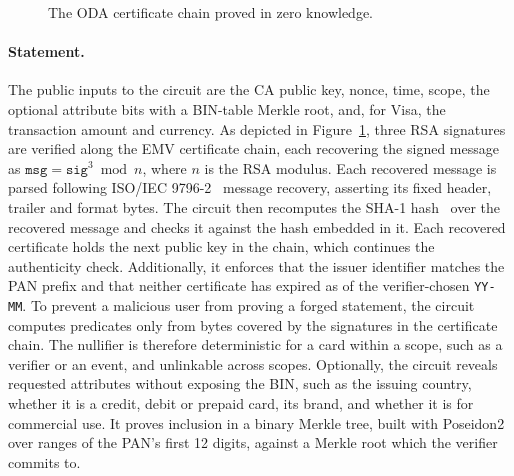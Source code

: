 \documentclass[10pt,a4paper]{article}
\begin{document}
\begin{figure}[t]
\centering
{}
\caption{The ODA certificate chain proved in zero knowledge.}
\label{fig:chain}
\end{figure}

\paragraph{Statement.}
The public inputs to the circuit are the CA public key, nonce, time, scope, the optional attribute bits with a BIN-table Merkle root, and, for Visa, the transaction amount and currency.
As depicted in Figure~\ref{fig:chain}, three RSA signatures are verified along the EMV certificate chain, each recovering the signed message as $\texttt{msg} = \texttt{sig} ^ 3 \bmod n$, where $n$ is the RSA modulus.
Each recovered message is parsed following ISO/IEC 9796-2~\cite{iso9796-2} message recovery, asserting its fixed header, trailer and format bytes.
The circuit then recomputes the SHA-1 hash~\cite{fips180-4} over the recovered message and checks it against the hash embedded in it.
Each recovered certificate holds the next public key in the chain, which continues the authenticity check.
Additionally, it enforces that the issuer identifier matches the PAN prefix and that neither certificate has expired as of the verifier-chosen \texttt{YY-MM}.
To prevent a malicious user from proving a forged statement, the circuit computes predicates only from bytes covered by the signatures in the certificate chain.
The nullifier is therefore deterministic for a card within a scope, such as a verifier or an event, and unlinkable across scopes.
Optionally, the circuit reveals requested attributes without exposing the BIN, such as the issuing country, whether it is a credit, debit or prepaid card, its brand, and whether it is for commercial use.
It proves inclusion in a binary Merkle tree, built with Poseidon2 over ranges of the PAN's first 12 digits, against a Merkle root which the verifier commits to.
\end{document}
